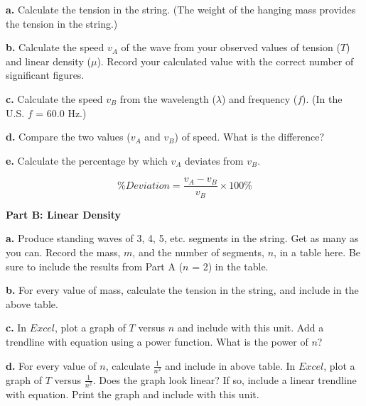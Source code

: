 \textbf{a. } Calculate the tension in the string. (The weight of the hanging mass provides the tension in the string.)

\vspace{3cm}

\newpage

\textbf{b. } Calculate the speed $v_A$ of the wave from your observed values of tension ($T$) and linear density ($\mu $). Record your calculated value with the correct number of significant figures.


\vspace{4cm}

\textbf{c. } Calculate the speed $v_B$ from the wavelength ($\lambda $) and frequency ($f$). (In the U.S. $f$ = 60.0 Hz.)

\vspace{4cm}

\textbf{d. } Compare the two values ($v_A$ and $v_B$) of speed. What is the difference?

\vspace{4cm}

\textbf{e. } Calculate the percentage by which $v_A$ deviates from $v_B$.

\begin{equation}
\% Deviation =\frac {v_A - v_B}{v_B} \times 100\%
\end{equation}

\vspace{3cm}

\newpage

\textbf{Part B: Linear Density}

\textbf{a. } Produce standing waves of 3, 4, 5, etc. segments in the string. Get as many as you can. Record the mass, $m$, and the number of segments, $n$, in a table here. Be sure to include the results from Part A ($n$ = 2) in the table.

\vspace{6cm}

\textbf{b. } For every value of mass, calculate the tension in the string, and include in the above table.

\textbf{c. } In $Excel$, plot a graph of $T$ versus $n$ and include with this unit. Add a trendline with equation using a power function. What is the power of $n$?
\vspace{20mm}

\textbf{d. } For every value of $n$, calculate $\frac{1}{n^2}$ and include in above table. In $Excel$, plot a graph of $T$ versus $\frac{1}{n^2}$. Does the graph look linear? If so, include a linear trendline with equation. Print the graph and include with this unit.
\vspace{20mm}

